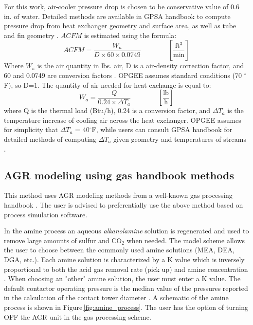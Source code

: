 \documentclass[11pt]{report}
\newcommand{\eqnunitfrac}[2]{\quad\quad \scriptstyle{\left[\frac{\text{#1}}{\text{#2}}\right]}}
\begin{document}
For this work, air-cooler pressure drop is chosen to be conservative value of 0.6 in. of water. Detailed methods are available in GPSA handbook to compute pressure drop from heat exchanger geometry and surface area, as well as tube and fin geometry \cite[Ch. 10]{GPSA2004}. $ACFM$ is estimated using the formula:
\begin{equation}
ACFM = \frac{W_a}{D \times 60 \times 0.0749} \quad\quad\eqnunitfrac{ft$^3$}{min}
\end{equation}
Where $W_a$ is the air quantity in lbs. air, D is a air-density correction factor, and 60 and 0.0749 are conversion factors \cite[p. 10-16]{GPSA2004}.  OPGEE assumes standard conditions (70 $^\circ$F), so D=1. The quantity of air needed for heat exchange is equal to:
\begin{equation}
W_a = \frac{Q}{0.24 \times \Delta T_a} \quad\quad\eqnunitfrac{lb}{h}
\end{equation}
where Q is the thermal load (Btu/h), 0.24 is a conversion factor, and $\Delta T_a$ is the temperature increase of cooling air across the heat exchanger. OPGEE assumes for simplicity that $\Delta T_a$ = 40$^\circ$F, while users can consult GPSA handbook for detailed methods of computing $\Delta T_a$ given geometry and temperatures of streams \cite[Ch. 10]{GPSA2004}.

\subsection{AGR modeling using gas handbook methods}

This method uses AGR modeling methods from a well-known gas processing handbook \cite{Manning1991}. The user is advised to preferentially use the above method based on process simulation software.

In the amine process an aqueous \textit{alkanolamine} solution is regenerated and used to remove large amounts of sulfur and CO$_{2}$ when needed. The model scheme allows the user to choose between the commonly used amine solutions (MEA, DEA, DGA, etc.). Each amine solution is characterized by a K value which is inversely proportional to both the acid gas removal rate (pick up) and amine concentration \cite[p. 115]{Manning1991}. When choosing an "other" amine solution, the user must enter a K value. The default contactor operating pressure is the median value of the pressures reported in the calculation of the contact tower diameter \cite{Khan1985} \cite[p. 117]{Manning1991}. A schematic of the amine process is shown in Figure\,\ref{fig:amine_process}. The user has the option of turning OFF the AGR unit in the gas processing scheme.  
\end{document}
